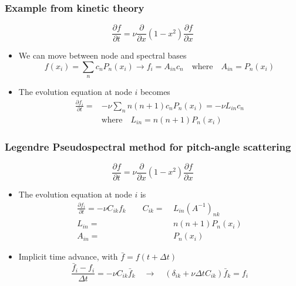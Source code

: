 \begin{frame}
  \frametitle{Example from kinetic theory\\
    }
  \begin{tcolorbox}
    \begin{equation*}
      \frac{\partial f}{\partial t} = \nu \frac{\partial}{\partial x}
      (1-x^2) \frac{\partial f}{\partial x} 
    \end{equation*}
  \end{tcolorbox}
  \begin{itemize}
  \item<1->We can move between node and spectral bases  
    \begin{equation*}
      f(x_i) = \sum_n c_n P_n(x_i) \longrightarrow f_i = A_{in} c_n \quad \text{where} \quad A_{in} = P_n(x_i) 
    \end{equation*}
    \item<2->The evolution equation at node $i$ becomes  
    \begin{align*}
      \frac{\partial f_i}{\partial t} = & -\nu \sum_n n(n+1) c_n P_n(x_i)
      = -\nu L_{in} c_n \\
      & \text{where} \quad L_{in} = n(n+1)P_n(x_i)  
    \end{align*}
    \end{itemize}
 \end{frame}
\begin{frame}
  \frametitle{Legendre Pseudospectral method for pitch-angle scattering\\
    }
  \begin{tcolorbox}
    \begin{equation*}
      \frac{\partial f}{\partial t} = \nu \frac{\partial}{\partial x}
      (1-x^2) \frac{\partial f}{\partial x} 
    \end{equation*}
  \end{tcolorbox}
  \begin{itemize}
    \item <1->The evolution equation at node $i$ is 
    \begin{align*}
  \frac{\partial f_i}{\partial t} = -\nu C_{ik} f_k \qquad C_{ik} = &~L_{in} (A^{-1})_{nk} \\
      L_{in} = &~n(n+1)P_n(x_i) \\
      A_{in} = &~P_n(x_i)
    \end{align*}
    \item<2-> Implicit time advance, with $\bar{f} = f(t+\Delta t)$
    \begin{equation*}
\frac{\bar{f}_i-f_i}{\Delta t} = -\nu C_{ik} \bar{f}_k \quad \longrightarrow\quad
      \left(\delta_{ik} + \nu \Delta t C_{ik} \right) \bar{f}_k = f_i
    \end{equation*}
  \end{itemize}
\end{frame}
